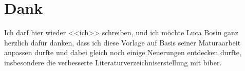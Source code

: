 \chapter*{Dank}
Ich darf hier wieder <<ich>> schreiben, und ich möchte Luca Bosin ganz herzlich
dafür danken, dass ich diese Vorlage auf Basis seiner Maturaarbeit anpassen
durfte und dabei gleich noch einige Neuerungen entdecken durfte, insbesondere
die verbesserte Literaturverzeichniserstellung mit biber.


